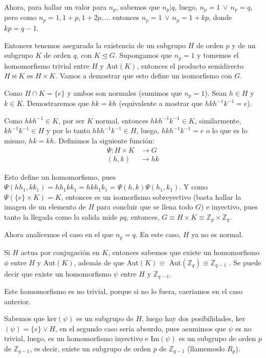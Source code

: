 \documentclass{article}
\begin{document}
    Ahora, para hallar un valor para $n_p$, sabemos que $n_p | q$, luego, $n_p = 1 \,\lor\, n_p = q$, 
    pero como $n_p = 1, 1 + p, 1 + 2p, ...$ entonces $n_p = 1 \,\lor\, n_p = 1 + kp$, donde 
    $kp = q - 1$.

    Entonces tenemos asegurada la existencia de un subgrupo $H$ de orden $p$ y de un 
    subgrupo $K$ de orden $q$, con $K \trianglelefteq G$. Supongamos que $n_p = 1$ y 
    tomemos el homomorfismo trivial 
    entre $H$ y Aut$(K)$, entonces el producto semidirecto $H \Join K$ es $H \times K$. 
    Vamos a demostrar que esto define un isomorfismo con $G$.

    Como $H \cap K = \{e\}$ y ambos son normales (sumimos que $n_p = 1$). Sean 
    $h \in H$ y $k \in K$. Demostraremos que $hk = kh$ (equivalente a mostrar que $hkh^{-1}k^{-1} = e$).


    Como $hkh^{-1} \in K$, por ser $K$ normal, entonces $hkh^{-1}k^{-1} \in K$, similarmente, 
    $kh^{-1}k^{-1} \in H$ y por lo tanto $hkh^{-1}k^{-1} \in H$, luego, $hkh^{-1}k^{-1} = e$ o 
    lo que es lo mismo, $hk = kh$. Definimos la siguiente función:
    \[
      \begin{aligned}
        \Psi: H \times K &\to G \\
        (h, k) &\to hk
      \end{aligned}
    \]

    Esto define un homomorfismo, pues $\Psi(h h_1, k k_1) = h h_1 k k_1 = h k h_1 k_1 = \Psi(h, k) \Psi(h_1, k_1)$. 
    Y como $\Psi(\{e\} \times K) = K$, entonces es un isomorfismo sobreyectivo (basta hallar la imagen de un
    elemento de $H$ para concluir que se llena todo $G$) e inyectivo, pues tanto la llegada como la salida
    mide $pq$, entonces, $G \equiv H \times K \equiv \mathbb{Z}_p \times \mathbb{Z}_q$.


    Ahora analicemos el caso en el que $n_p = q$. En este caso, $H$ ya no es normal.


    Si $H$ actua por conjugación en $K$, entonces sabemos que existe un homomorfismo 
    $\phi$ entre $H$ y Aut$(K)$, además de que Aut$(K) \equiv$ Aut$(\mathbb{Z}_q) \equiv \mathbb{Z}_{q-1}$
    . Se puede decir que existe un homomorfismo $\psi$ entre $H$ y $\mathbb{Z}_{q-1}$. 


    Este homomorfismo es no trivial, porque si no lo fuera, caeriamos en el caso anterior. 

    Sabemos que ker$(\psi)$ es un subgrupo de $H$, luego hay dos posibilidades, ker$(\psi) = \{e\} \lor H$, 
    en el segundo caso sería absurdo, pues asumimos que $\psi$ es no trivial, luego, es un homomorfismo 
    inyectivo e Im$(\psi)$ es un subgrupo de orden $p$ de $\mathbb{Z}_{q-1}$, es decir, 
    existe un subgrupo de orden $p$ de $\mathbb{Z}_{q-1}$ (llamemoslo $R_p$).
\end{document}
